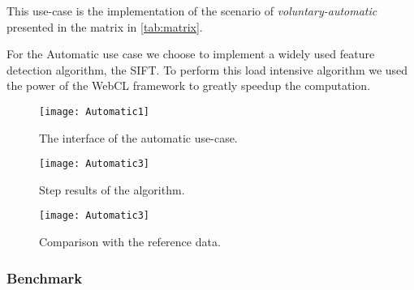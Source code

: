 This use-case is the implementation of the scenario of \emph{voluntary-automatic}
presented in the matrix  in \autoref{tab:matrix}.

For the Automatic use case we choose to implement a widely used feature detection
algorithm, the \ac{SIFT}. To perform this load intensive algorithm we used the
power of the \ac{WebCL} framework to greatly speedup the computation.



\begin{figure}[htb]
    \centering
    \texttt{[image: Automatic1]}
    \caption{The interface of the automatic use-case.}
    \label{fig:Automatic1}
\end{figure}


\begin{figure}[htb]
    \centering
    \texttt{[image: Automatic3]}
    \caption{Step results of the algorithm.}
    \label{fig:Automatic1}
\end{figure}


\begin{figure}[htb]
    \centering
    \texttt{[image: Automatic3]}
    \caption{Comparison with the reference data.}
    \label{fig:Automatic1}
\end{figure}


% 



\subsubsection{Benchmark}
